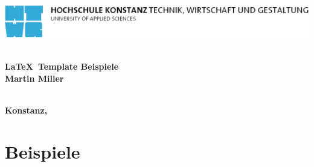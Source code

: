 \documentclass[TGAI_Laborbericht.tex]{subfiles}
\begin{document}
\begin{titlepage}

\vspace*{-3.5cm}

\begin{flushleft}
\hspace*{-1cm} \includegraphics[width=15.7cm]{preface/htwg-logo}
\end{flushleft}

\vspace{1cm}

\begin{center}
	\large{
		\textbf{\strLecture} \\[2cm]
	}
	\Huge{
		\textbf{\LaTeX ~Template Beispiele} \\[2cm]
	}
	\Large{
		\textbf{Martin Miller}} \\[3cm]
	\large{
		\textbf{} \\[2.3cm]
	}
	
	\large{
		\textbf{Konstanz, \strDate}
	}
\end{center}

\end{titlepage}
\thispagestyle{empty}



%
%
\tableofcontents

%
%
{}
\listoffigures
\thispagestyle{lists}
\newpage

%
%
{}
\listoftables
\thispagestyle{lists}
\newpage

%
%
\renewcommand\lstlistingname{Listing}
\renewcommand\lstlistlistingname{Listingverzeichnis}
\lstlistoflistings
{}
\thispagestyle{lists}
\newpage

%
%



\chapter{Beispiele}
\label{chap:EINL}
\pagestyle{plain}
\end{document}
